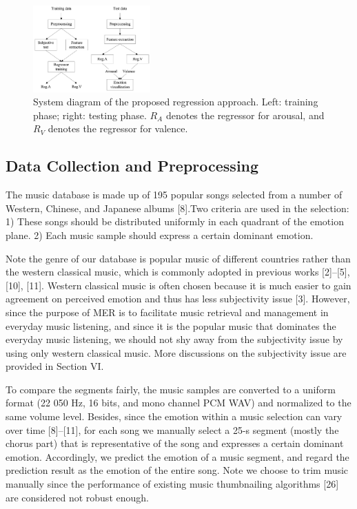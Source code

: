\documentclass[journal, twoside]{IEEEtran}
\begin{document}
\begin{figure}[h]
\centering
\captionsetup{justification=centering}
\includegraphics[width=0.4\textwidth, height=0.3\textwidth]{fig2.png}
\caption{System diagram of the proposed regression approach. Left: training phase; right: testing phase. \(R_A\) denotes the regressor for arousal, and \(R_V\) denotes the regressor for valence.}
\label{fig2}
\end{figure}

\subsection{Data Collection and Preprocessing}
The music database is made up of 195 popular songs selected from a number of Western, Chinese, and Japanese albums [8].Two criteria are used in the selection: 1) These songs should be distributed uniformly in each quadrant of the emotion plane. 2) Each music sample should express a certain dominant emotion.

Note the genre of our database is popular music of different countries rather than the western classical music, which is commonly adopted in previous works [2]–[5], [10], [11]. Western classical music is often chosen because it is much easier to gain agreement on perceived emotion and thus has less subjectivity issue [3]. However, since the purpose of MER is to facilitate music retrieval and management in everyday music listening,
and since it is the popular music that dominates the everyday music listening, we should not shy away from the subjectivity issue by using only western classical music. More discussions
on the subjectivity issue are provided in Section VI.

To compare the segments fairly, the music samples are converted to a uniform format (22 050 Hz, 16 bits, and mono channel PCM WAV) and normalized to the same volume level. Besides, since the emotion within a music selection can vary over time [8]–[11], for each song we manually select a 25-s segment (mostly the chorus part) that is representative of the
song and expresses a certain dominant emotion. Accordingly, we predict the emotion of a music segment, and regard the prediction result as the emotion of the entire song. Note we choose to trim music manually since the performance of existing music thumbnailing algorithms [26] are considered not robust enough.
\end{document}
